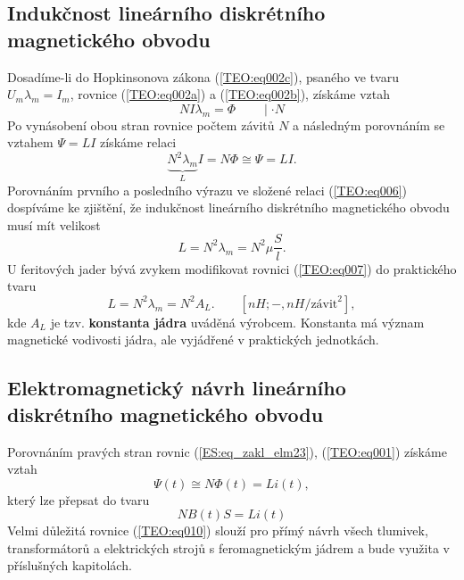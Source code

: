     \subsection{Indukčnost lineárního diskrétního magnetického obvodu}
      Dosadíme-li do Hopkinsonova zákona (\ref{TEO:eq002c}), psaného ve tvaru \(U_m\lambda_m=I_m\), 
      rovnice (\ref{TEO:eq002a}) a (\ref{TEO:eq002b}), získáme vztah
      \begin{equation}  \label{TEO:eq005}
        NI\lambda_m = \Phi\qquad\mid \cdot N
      \end{equation}
      Po vynásobení obou stran rovnice počtem závitů \(N\) a následným porovnáním se vztahem \(\Psi 
      = LI\) získáme relaci
      \begin{equation}  \label{TEO:eq006}
        \underbrace{N^2\lambda_m}_L I = N\Phi \cong\Psi = LI.
      \end{equation}
      Porovnáním prvního a posledního výrazu ve složené relaci (\ref{TEO:eq006}) dospíváme ke 
      zjištění, že indukčnost lineárního diskrétního magnetického obvodu musí mít velikost
      \begin{equation}  \label{TEO:eq007}
        \boxed{L = N^2\lambda_m = N^2\mu\frac{S}{l}.}
      \end{equation}
      U feritových jader bývá zvykem modifikovat rovnici (\ref{TEO:eq007}) do praktického tvaru 
      \begin{equation}  \label{TEO:eq008}
        \boxed{L = N^2\lambda_m = N^2A_L.} \qquad [nH; -, nH/\text{závit}^2],
      \end{equation}
      kde \(A_L\) je tzv. \textbf{konstanta jádra} uváděná výrobcem. Konstanta má význam magnetické 
      vodivosti jádra, ale vyjádřené v praktických jednotkách.

    \subsection{Elektromagnetický návrh lineárního diskrétního magnetického obvodu}
       Porovnáním pravých stran rovnic (\ref{ES:eq_zakl_elm23}), (\ref{TEO:eq001}) získáme vztah
      \begin{equation}  \label{TEO:eq009}
        \Psi(t) \cong N\Phi(t) = Li(t),
      \end{equation}
      který lze přepsat do tvaru
      \begin{equation}  \label{TEO:eq010}
        \boxed{NB(t)S = Li(t)}
      \end{equation}
      Velmi důležitá rovnice (\ref{TEO:eq010}) slouží pro přímý návrh všech tlumivek, 
      transformátorů a elektrických strojů s feromagnetickým jádrem a bude využita v příslušných 
      kapitolách.
      
